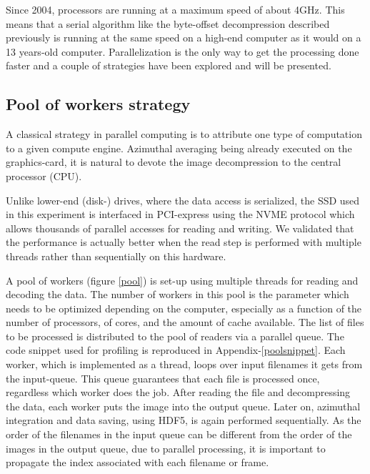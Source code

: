 \documentclass[preprint]{iucr}              %
\begin{document}
Since 2004, processors are running at a maximum speed of about 4GHz.
This means that a serial algorithm like the byte-offset decompression described
previously is running at the same speed on a high-end computer as it
would on a 13 years-old computer.
Parallelization is the only way to get the processing done faster and a couple
of strategies have been explored and will be presented.

\subsection{Pool of workers strategy} 

A classical strategy in parallel computing is to attribute one type of
computation to a given compute engine.
Azimuthal averaging being already executed on the graphics-card, it is natural
to devote the image decompression to the central processor (CPU).

Unlike lower-end (disk-) drives, where the data access is serialized,
the SSD used in this experiment is interfaced in PCI-express using the NVME
protocol \cite{nvme} which allows thousands of parallel accesses for reading and
writing.
We validated that the performance is actually better when the read step is
performed with multiple threads rather than sequentially on this hardware.

A pool of workers (figure \ref{pool}) is set-up using multiple threads for
reading and decoding the data.  
The number of workers in this pool is the parameter which needs to be
optimized depending on the computer, especially as a function of the
number of processors, of cores, and the amount of cache available.
The list of files to be processed is distributed to the pool of readers via
a parallel queue.
The code snippet used for profiling is reproduced in Appendix-\ref{poolsnippet}.
Each worker, which is implemented as a thread, loops over input filenames it gets 
from the input-queue.
This queue guarantees that each file is processed once, regardless which worker 
does the job.
After reading the file and decompressing the data, each worker puts the image
into the output queue.
Later on, azimuthal integration and data saving, using HDF5, is again performed
sequentially. 
As the order of the filenames in the input queue can be different from the order
of the images in the output queue, due to parallel processing, it is important
to propagate the index associated with each filename or frame.
\end{document}
